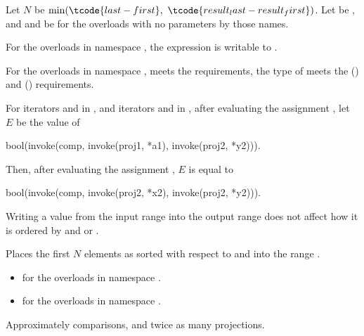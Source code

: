 \begin{itemdescr}
\pnum
Let $N$ be $\min(\tcode{last - first}, \ \tcode{result_last - result_first})$.
Let  be , and
 and  be 
for the overloads with no parameters by those names.

\pnum
\mandates
For the overloads in namespace ,
the expression 
is writable to .

\pnum
\expects
For the overloads in namespace ,
 meets
the  requirements,
the type of  meets
the  () and
 () requirements.

\pnum
For iterators  and  in , and
iterators  and  in ,
after evaluating the assignment , let $E$ be the value of
\begin{codeblock}
bool(invoke(comp, invoke(proj1, *a1), invoke(proj2, *y2))).
\end{codeblock}
Then, after evaluating the assignment , $E$ is equal to
\begin{codeblock}
bool(invoke(comp, invoke(proj2, *x2), invoke(proj2, *y2))).
\end{codeblock}
\begin{note}
Writing a value from the input range into the output range does not affect
how it is ordered by  and  or .
\end{note}

\pnum
\effects
Places the first $N$ elements
as sorted with respect to  and 
into the range .

\pnum
\returns
\begin{itemize}
\item
   for the overloads in namespace .
\item
   for
  the overloads in namespace .
\end{itemize}

\pnum
\complexity
Approximately  comparisons,
and twice as many projections.
\end{itemdescr}

